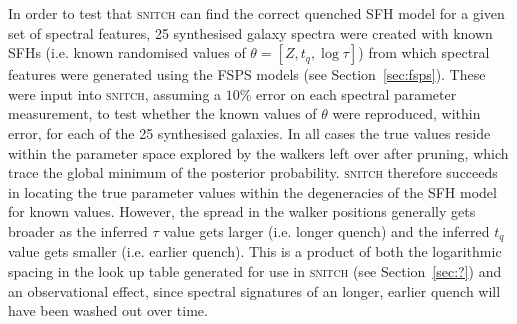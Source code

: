 \documentclass[useAMS,usenatbib]{mn2e}
\begin{document}


In order to test that \textsc{snitch} can find the correct quenched SFH model for a given set of spectral features, 25 synthesised galaxy spectra were created with known SFHs (i.e. known randomised values of $\theta = [Z, t_q, \log \tau]$) from which spectral features were generated using the FSPS models (see Section~\ref{sec:fsps}). These were input into \textsc{snitch}, assuming a $10\%$ error on each spectral parameter measurement, to test whether the known values of $\theta$ were reproduced, within error, for each of the 25 synthesised galaxies. %
In all cases the true values reside within the parameter space explored by the walkers left over after pruning, which trace the global minimum of the posterior probability. \textsc{snitch} therefore succeeds in locating the true parameter values within the degeneracies of the SFH model for known values. However, the spread in the walker positions generally gets broader as the inferred $\tau$ value gets larger (i.e. longer quench) and the inferred $t_q$ value gets smaller (i.e. earlier quench). This is a product of both the logarithmic spacing in the look up table generated for use in \textsc{snitch} (see Section~\ref{sec:?}) and an observational effect, since spectral signatures of an longer, earlier quench will have been washed out over time. 
\end{document}
